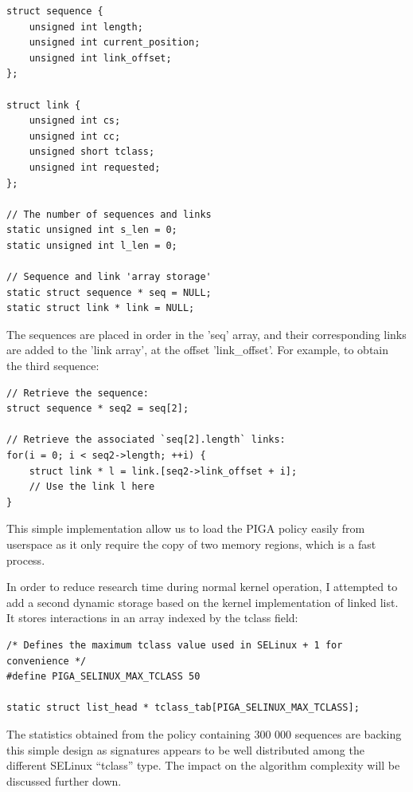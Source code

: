 \documentclass[pdftex,a4paper,titlepage,11pt]{article}
\begin{document}
\begin{lstlisting}
struct sequence {
	unsigned int length;
	unsigned int current_position;
	unsigned int link_offset;
};

struct link {
	unsigned int cs;
	unsigned int cc;
	unsigned short tclass;
	unsigned int requested;
};

// The number of sequences and links
static unsigned int s_len = 0;
static unsigned int l_len = 0;

// Sequence and link 'array storage'
static struct sequence * seq = NULL;
static struct link * link = NULL;
\end{lstlisting}

\medskip

The sequences are placed in order in the 'seq' array, and their corresponding
links are added to the 'link array', at the offset 'link\_offset'. For example,
to obtain the third sequence:

\begin{lstlisting}
// Retrieve the sequence:
struct sequence * seq2 = seq[2];

// Retrieve the associated `seq[2].length` links:
for(i = 0; i < seq2->length; ++i) {
	struct link * l = link.[seq2->link_offset + i];
	// Use the link l here
}
\end{lstlisting}

\medskip

This simple implementation allow us to load the PIGA policy easily from
userspace as it only require the copy of two memory regions, which is a fast
process.

\bigskip

In order to reduce research time during normal kernel operation, I attempted to
add a second dynamic storage based on the kernel implementation of linked list.
It stores interactions in an array indexed by the tclass field:

\begin{lstlisting}
/* Defines the maximum tclass value used in SELinux + 1 for convenience */
#define PIGA_SELINUX_MAX_TCLASS 50

static struct list_head * tclass_tab[PIGA_SELINUX_MAX_TCLASS];
\end{lstlisting}

\medskip

The statistics obtained from the policy containing 300 000 sequences are
backing this simple design as signatures appears to be well distributed among
the different SELinux ``tclass'' type. The impact on the algorithm complexity
will be discussed further down.
\end{document}
